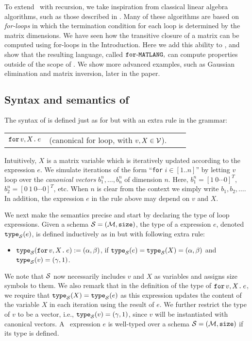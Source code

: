 
To extend \lang\ with recursion, we take inspiration from classical linear algebra algorithms, such as those described in \cite{num}. Many of these algorithms are based on \textit{for-loops} in which the termination condition for each loop is determined by the matrix dimensions. We have seen how the transitive closure of a matrix can be computed using for-loops in the Introduction. Here we add this ability to \lang, and show that the resulting language, called $\texttt{for}\text{-}\texttt{MATLANG},$ can compute properties outside of the scope of \lang. We show more advanced examples, such as Gaussian elimination and matrix inversion, later in the paper. 

\subsection{Syntax and semantics of \langfor}\label{ss:fML} The syntax of \langfor is defined just as for \lang but with an extra rule in the grammar:
\medskip

\begin{tabular}{lcll}
 $\texttt{for}\, v,X \texttt{.}\, e$ & (canonical for loop, with $v, X \in \mathcal{V}$). 
\end{tabular}

\medskip
\noindent Intuitively, $X$ is a matrix variable which is iteratively updated according to the expression $e$. We simulate iterations of the form ``\texttt{for} $i\in [1..n]$'' by letting $v$ loop over the \textit{canonical vectors} $b_1^n,\ldots,b_n^n$ of dimension $n$. Here,
$b_1^n = [1\ 0 \cdots 0]^T$, $b_2^n = [0\ 1\ 0 \cdots 0]^T$, etc. When $n$ is clear from the context we simply write $b_1,b_2,\ldots$. In addition, the expression $e$ in the rule above may depend on $v$ and $X$. 

We next make the semantics precise and start by
declaring the type of loop expressions.
Given a schema $\mathcal{S}=(\mathcal{M},\texttt{size})$, the type of a \langfor expression $e$, denoted $\texttt{type}_{\mathcal{S}}(e)$, is defined inductively as in \lang but with following extra rule:
\begin{itemize}
\item $\texttt{type}_{\mathcal{S}}(\texttt{for}\, v,X \texttt{.}\, e) := (\alpha,\beta)$, if 
$\texttt{type}_{\mathcal{S}}(e)=\texttt{type}_{\mathcal{S}}(X) =(\alpha,\beta)$ and $\texttt{type}_{\mathcal{S}}(v) = (\gamma,1)$.
\end{itemize}
We note that $\mathcal{S}$ now necessarily includes $v$ and $X$ as variables and assigns size symbols to them.
We also remark that in the definition of the type of $\texttt{for}\, v,X \texttt{.}\, e$, we require that $\texttt{type}_{\mathcal{S}}(X) = \texttt{type}_{\mathcal{S}}(e)$ as this expression updates the content of the variable $X$ in each iteration using the result of $e$. We further restrict the type of 
$v$ to be a vector, i.e., $\texttt{type}_{\mathcal{S}}(v)=(\gamma,1)$, since $v$ will be instantiated with canonical vectors.
A \langfor\ expression $e$ is well-typed over a schema $\mathcal{S}=(\mathcal{M},\texttt{size})$ if its type is defined. 

